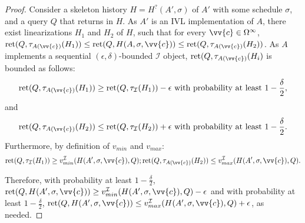 \begin{proof}
    Consider a skeleton history $H=H^?(A', \sigma)$ of $A'$ with some schedule $\sigma$, and a
    query $Q$ that returns in $H$. As $A'$ is an IVL implementation of $A$, there exist linearizations
    $H_1$ and $H_2$ of $H$, such that for every $\vv{c}\in\Omega^\infty$,
    $\text{ret}(Q, \tau_{A(\vv{c})}(H_1)) \leq \text{ret}(Q, H(A, \sigma, \vv{c})) \leq \text{ret}(Q, \tau_{A(\vv{c})}(H_2))$.
    As $A$ implements a sequential $(\epsilon,\delta)$-bounded $\mathcal{I}$ object,
    $\text{ret}(Q, \tau_{A(\vv{c})}(H_i)$ is bounded as follows:
    \[ \text{ret}(Q, \tau_{A(\vv{c})}(H_1)) \geq \text{ret}(Q, \tau_{\mathcal{I}}(H_1)) - \epsilon \text{ with probability at least } 1-\frac{\delta}{2}, \]
    and
    \[ \text{ret}(Q, \tau_{A(\vv{c})}(H_2)) \leq \text{ret}(Q, \tau_{\mathcal{I}}(H_2)) + \epsilon \text{ with probability at least } 1-\frac{\delta}{2}. \]
    Furthermore, by definition of $v_{min}$ and $v_{max}$:
    \[ \text{ret}(Q, \tau_{\mathcal{I}}(H_1)) \geq  v^{\mathcal{I}}_{min}(H(A', \sigma, \vv{c}),Q) ; \\ 
    \text{ret}(Q, \tau_{A(\vv{c})}(H_2)) \leq v^{\mathcal{I}}_{max}(H(A', \sigma, \vv{c}),Q).\]

    Therefore, with probability at least $1-\frac{\delta}{2}$, $\text{ret}(Q, H(A', \sigma, \vv{c})) \geq v^{\mathcal{I}}_{min}(H(A', \sigma, \vv{c}),Q) - \epsilon$ and
    with probability at least $1-\frac{\delta}{2}$, $\text{ret}(Q, H(A', \sigma, \vv{c})) \leq v^{\mathcal{I}}_{max}(H(A', \sigma, \vv{c}),Q) + \epsilon$, as needed.



\end{proof}
